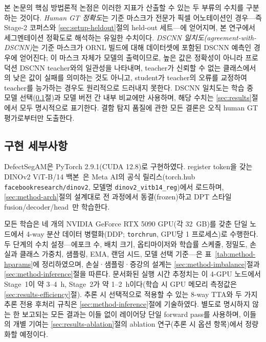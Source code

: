 본 논문의 핵심 방법론적 논점은 이러한 지표가 산출할 수 있는 두 부류의
수치를 구분하는 것이다. \emph{Human GT 정확도}는 기준 마스크가 전문가
픽셀 어노테이션인 경우---즉 Stage-2 코퍼스와 \ref{sec:setup-heldout}절의
held-out 세트---에 얻어지며, 본 연구에서 세그멘테이션 정확도로 해석하는
유일한 수치이다. \emph{DSCNN 일치도(agreement-with-DSCNN)}는 기준
마스크가 ORNL 빌드에 대해 데이터셋에 포함된 DSCNN 예측인 경우에
얻어진다; 이 마스크 자체가 모델의 출력이므로, 높은 값은 정확성이
아니라 프로덕션 DSCNN teacher와의 일관성을 나타내며, teacher가 신뢰할
수 없는 클래스에서의 낮은 값이 실패를 의미하는 것도 아니고, student가
teacher의 오류를 교정하여 teacher를 능가하는 경우도 원리적으로 드러내지
못한다. DSCNN
일치도는 학습 중 모델 선택(\ref{sec:setup-impl}절)과 모델 버전 간 내부
비교에만 사용하며, 해당 수치는 \ref{sec:results}절에서 모두 명시적으로
표기한다. 결함 탐지 품질에 관한 모든 결론은 오직 human GT 평가로부터만
도출한다.

\subsection{구현 세부사항}\label{sec:setup-impl}

DefectSegAM은 PyTorch 2.9.1(CUDA 12.8)로 구현하였다. register token을
갖는 DINOv2 ViT-B/14 백본~\cite{Oquab2024DINOv2,Darcet2024Registers}은
Meta AI의 공식 릴리스(torch.hub \texttt{facebookresearch/dinov2}, 모델명
\texttt{dinov2\_vitb14\_reg})에서 로드하며, \ref{sec:method-arch}절의
설계대로 전 과정에서 동결(frozen)하고 DPT 스타일
fusion\slash decoder\slash head~\cite{Ranftl2021DPT}만 학습한다.

모든 학습은 네 개의 NVIDIA GeForce RTX 5090 GPU(각 32~GB)를 갖춘 단일
노드에서 4-way 분산 데이터 병렬화(DDP; \texttt{torchrun}, GPU당 1
프로세스)로 수행한다. 두 단계의 수치 설정---에포크 수, 배치 크기,
옵티마이저와 학습률 스케줄, 정밀도, 손실과 클래스 가중치, 샘플링,
EMA, 랜덤 시드, 모델 선택 기준---은 표~\ref{tab:method-hparams}에
정리하였으며, 손실·샘플링·증강의 설계는 \ref{sec:method-imbalance}절과
\ref{sec:method-inference}절을 따른다. 문서화된 실행 시간 추정치는 이
4-GPU 노드에서 Stage~1이 약 3--4~h, Stage~2가 약 1--2~h이다(학습 시
GPU 메모리 측정값은 \ref{sec:results-efficiency}절). 추론 시 선택적으로
적용할 수 있는 8-way TTA와 두 가지 추론 전용 후처리 규칙은
\ref{sec:method-inference}절에 기술하였다. 별도로 명시하지 않는 한
보고되는 모든 결과는 이들 없이 레이어당 단일 forward pass를 사용하며,
이들의 개별 기여는 \ref{sec:results-ablation}절의 ablation 연구(추론 시
옵션 항목)에서 정량화할 예정이다.

